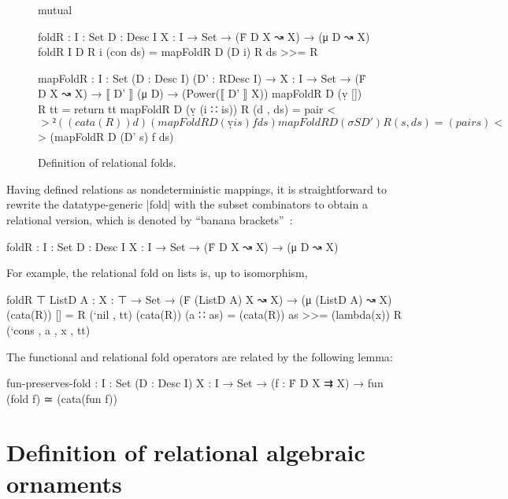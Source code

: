 
\begin{figure}
\codefigure
\begin{code}
mutual

  foldR :  {I : Set} {D : Desc I} {X : I → Set} → (Ḟ D X ↝ X) → (μ D ↝ X)
  foldR {I} {D} R {i} (con ds) = mapFoldR D (D i) R ds >>= R

  mapFoldR :  {I : Set} (D : Desc I) (D' : RDesc I) →
              {X : I → Set} → (Ḟ D X ↝ X) → ⟦ D' ⟧ (μ D) → (Power(⟦ D' ⟧ X))
  mapFoldR D (ṿ [])        R tt         = return tt
  mapFoldR D (ṿ (i ∷ is))  R (d  , ds)  = pair <$>²  ((cata(R)) d)
                                                     (mapFoldR D (ṿ is) f ds)
  mapFoldR D (σ S D')      R (s  , ds)  = (pair s) <$> (mapFoldR D (D' s) f ds)
\end{code}
\caption{Definition of relational folds.}
\label{fig:foldR}
\end{figure}

Having defined relations as nondeterministic mappings, it is straightforward to rewrite the datatype-generic |fold| with the subset combinators to obtain a relational version, which is denoted by ``banana brackets''~\citep{Meijer-bananas}:
\begin{code}
foldR :  {I : Set} {D : Desc I} {X : I → Set} → (Ḟ D X ↝ X) → (μ D ↝ X)
\end{code}
For example, the relational fold on lists is, up to isomorphism,
\begin{code}
foldR {⊤} {ListD A} :  {X : ⊤ → Set} →
                       (Ḟ (ListD A) X ↝ X) → (μ (ListD A) ↝ X)
(cata(R)) []        =   R (`nil , tt)
(cata(R)) (a ∷ as)  =   (cata(R)) as >>= (lambda(x)) R (`cons , a , x , tt)
\end{code}
The functional and relational fold operators are related by the following lemma:
\begin{code}
fun-preserves-fold :  {I : Set} (D : Desc I) {X : I → Set} →
                      (f : Ḟ D X ⇉ X) → fun (fold f) ≃ (cata(fun f))
\end{code}

\section{Definition of relational algebraic ornaments}

